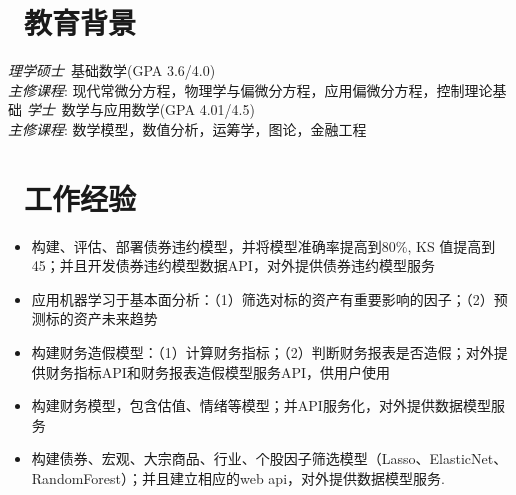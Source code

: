 \documentclass{resume}
\begin{document}


 
\section{\faGraduationCap\  教育背景}
\textit{理学硕士}\ 基础数学(GPA 3.6/4.0)\\
\textit{主修课程}:
现代常微分方程，物理学与偏微分方程，应用偏微分方程，控制理论基础
\textit{学士}\ 数学与应用数学(GPA 4.01/4.5)\\
\textit{主修课程}:
数学模型，数值分析，运筹学，图论，金融工程

\section{\faUsers\ 工作经验}
\role{数据科学家}{}
\begin{onehalfspacing}
\begin{itemize}
  \item 构建、评估、部署债券违约模型，并将模型准确率提高到80\%, KS 值提高到45；并且开发债券违约模型数据API，对外提供债券违约模型服务
  \item 应用机器学习于基本面分析：（1）筛选对标的资产有重要影响的因子；（2）预测标的资产未来趋势	 
  \item 构建财务造假模型：（1）计算财务指标；（2）判断财务报表是否造假；对外提供财务指标API和财务报表造假模型服务API，供用户使用	  
  \item 构建财务模型，包含估值、情绪等模型；并API服务化，对外提供数据模型服务
  \item 构建债券、宏观、大宗商品、行业、个股因子筛选模型（Lasso、ElasticNet、RandomForest）；并且建立相应的web api，对外提供数据模型服务.	  
\end{itemize}
\end{onehalfspacing}
\end{document}
